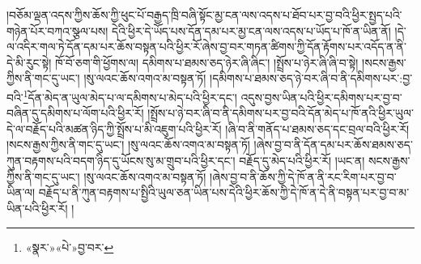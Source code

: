 །བཅོམ་ལྡན་འདས་ཀྱིས་ཆོས་ཀྱི་ཕུང་པོ་བརྒྱད་ཁྲི་བཞི་སྟོང་མྱ་ངན་ལས་འདས་པ་ཐོབ་པར་བྱ་བའི་ཕྱིར་སྤྱད་པའི་གཉེན་པོར་བཀའ་སྩལ་པས། དེའི་ཕྱིར་དེ་ཡོད་པས་དོན་དམ་པར་མྱ་ངན་ལས་འདས་པ་ཡོད་པ་ཁོ་ན་ཡིན་ནོ། །དེ་ལ་འདིར་གལ་ཏེ་དོན་དམ་པར་ཆོས་བསྟན་པའི་ཕྱིར་རོ་ཞེས་བྱ་བར་གཏན་ཚིགས་ཀྱི་དོན་རྟོགས་པར་འདོད་ན་ནི་དེ་མི་རུང་སྟེ། ཁོ་བོ་ཅག་གི་ཕྱོགས་ལ། དམིགས་པ་ཐམས་ཅད་ཉེར་ཞི་ཞིང་། །སྤྲོས་པ་ཉེར་ཞི་ཞི་བ་སྟེ། །སངས་རྒྱས་ཀྱིས་ནི་གང་དུ་ཡང་། །སུ་ལའང་ཆོས་འགའ་མ་བསྟན་ཏོ། །དམིགས་པ་ཐམས་ཅད་ཉེ་བར་ཞི་བ་ནི་དམིགས་པར་:བྱ་བའི་\footnote{«སྣར་»«པེ་»བྱ་བར་}དོན་མེད་ན་ཡུལ་མེད་པ་ལ་དམིགས་པ་མེད་པའི་ཕྱིར་དང་། འདུས་བྱས་ཡིན་པའི་ཕྱིར་དམིགས་པར་བྱ་བ་བཞིན་དུ་དམིགས་པ་ལོག་པའི་ཕྱིར་རོ། །སྤྲོས་པ་ཉེ་བར་ཞི་བ་ནི་དམིགས་པར་བྱ་བའི་དོན་མེད་པ་ཁོ་ནའི་ཕྱིར་ཡུལ་དེ་ལ་བརྗོད་པའི་མཚན་ཉིད་ཀྱི་སྤྲོས་པ་མི་འཇུག་པའི་ཕྱིར་རོ། །ཞི་བ་ནི་གནོད་པ་ཐམས་ཅད་དང་བྲལ་བའི་ཕྱིར་རོ། །སངས་རྒྱས་ཀྱིས་ནི་གང་དུ་ཡང་། །སུ་ལའང་ཆོས་འགའ་མ་བསྟན་ཏོ། །ཞེས་བྱ་བ་ནི་དོན་དམ་པར་ཆོས་ཐམས་ཅད་ཀུན་བརྟགས་པའི་བདག་ཉིད་དུ་ཡོངས་སུ་མ་གྲུབ་པའི་ཕྱིར་དང་། བརྗོད་དུ་མེད་པའི་ཕྱིར་རོ། །ཡང་ན། སངས་རྒྱས་ཀྱིས་ནི་གང་དུ་ཡང་། །སུ་ལའང་ཆོས་འགའ་མ་བསྟན་ཏོ། །ཞེས་བྱ་བ་ནི་ཆོས་ཀྱི་དེ་ཁོ་ན་ནི་རང་རིག་པར་བྱ་བ་ཡིན་ལ། བརྗོད་པ་ནི་ཀུན་བརྟགས་པ་སྤྱིའི་ཡུལ་ཅན་ཡིན་པས་དེའི་ཕྱིར་ཆོས་ཀྱི་དེ་ཁོ་ན་དེ་ནི་བསྟན་པར་བྱ་བ་མ་ཡིན་པའི་ཕྱིར་རོ། །
